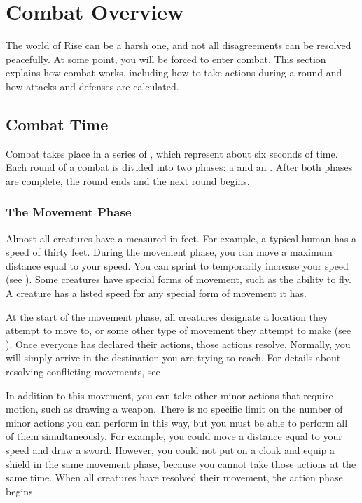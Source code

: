 \section{Combat Overview}
    The world of Rise can be a harsh one, and not all disagreements can be resolved peacefully.
    At some point, you will be forced to enter combat.
    This section explains how combat works, including how to take actions during a round and how attacks and defenses are calculated.

    \subsection{Combat Time}
        Combat takes place in a series of , which represent about six seconds of time.
        Each round of a combat is divided into two phases: a  and an .
        After both phases are complete, the round ends and the next round begins.

        \subsubsection{The Movement Phase}\label{The Movement Phase}
            Almost all creatures have a  measured in feet.
            For example, a typical human has a speed of thirty feet.
            During the movement phase, you can move a maximum distance equal to your speed.
            You can sprint to temporarily increase your speed (see ).
            Some creatures have special forms of movement, such as the ability to fly.
            A creature has a listed speed for any special form of movement it has.

            At the start of the movement phase, all creatures designate a location they attempt to move to, or some other type of movement they attempt to make (see ).
            Once everyone has declared their actions, those actions resolve.
            Normally, you will simply arrive in the destination you are trying to reach.
            For details about resolving conflicting movements, see .

            In addition to this movement, you can take other minor actions that require motion, such as drawing a weapon.
            There is no specific limit on the number of minor actions you can perform in this way, but you must be able to perform all of them simultaneously.
            For example, you could move a distance equal to your speed and draw a sword.
            However, you could not put on a cloak and equip a shield in the same movement phase, because you cannot take those actions at the same time.
            When all creatures have resolved their movement, the action phase begins.

